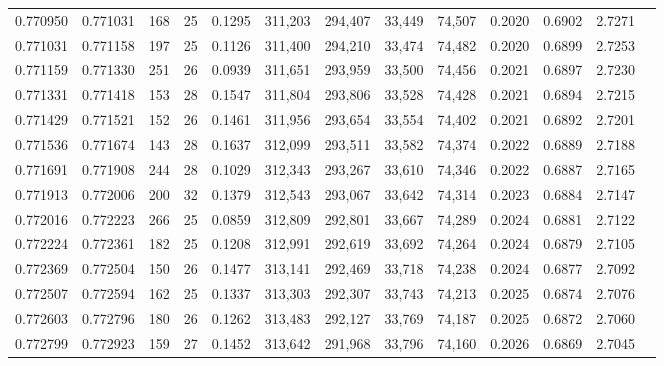 \begin{tabular}{rrrrrrrrrrrrr}
0.770950 & 0.771031 &   168 &  25 &                                     0.1295 & 311,203 & 294,407 &  33,449 &  74,507 & 0.2020 & 0.6902 & 2.7271 \\
0.771031 & 0.771158 &   197 &  25 &                                     0.1126 & 311,400 & 294,210 &  33,474 &  74,482 & 0.2020 & 0.6899 & 2.7253 \\
0.771159 & 0.771330 &   251 &  26 &                                     0.0939 & 311,651 & 293,959 &  33,500 &  74,456 & 0.2021 & 0.6897 & 2.7230 \\
0.771331 & 0.771418 &   153 &  28 &                                     0.1547 & 311,804 & 293,806 &  33,528 &  74,428 & 0.2021 & 0.6894 & 2.7215 \\
0.771429 & 0.771521 &   152 &  26 &                                     0.1461 & 311,956 & 293,654 &  33,554 &  74,402 & 0.2021 & 0.6892 & 2.7201 \\
0.771536 & 0.771674 &   143 &  28 &                                     0.1637 & 312,099 & 293,511 &  33,582 &  74,374 & 0.2022 & 0.6889 & 2.7188 \\
0.771691 & 0.771908 &   244 &  28 &                                     0.1029 & 312,343 & 293,267 &  33,610 &  74,346 & 0.2022 & 0.6887 & 2.7165 \\
0.771913 & 0.772006 &   200 &  32 &                                     0.1379 & 312,543 & 293,067 &  33,642 &  74,314 & 0.2023 & 0.6884 & 2.7147 \\
0.772016 & 0.772223 &   266 &  25 &                                     0.0859 & 312,809 & 292,801 &  33,667 &  74,289 & 0.2024 & 0.6881 & 2.7122 \\
0.772224 & 0.772361 &   182 &  25 &                                     0.1208 & 312,991 & 292,619 &  33,692 &  74,264 & 0.2024 & 0.6879 & 2.7105 \\
0.772369 & 0.772504 &   150 &  26 &                                     0.1477 & 313,141 & 292,469 &  33,718 &  74,238 & 0.2024 & 0.6877 & 2.7092 \\
0.772507 & 0.772594 &   162 &  25 &                                     0.1337 & 313,303 & 292,307 &  33,743 &  74,213 & 0.2025 & 0.6874 & 2.7076 \\
0.772603 & 0.772796 &   180 &  26 &                                     0.1262 & 313,483 & 292,127 &  33,769 &  74,187 & 0.2025 & 0.6872 & 2.7060 \\
0.772799 & 0.772923 &   159 &  27 &                                     0.1452 & 313,642 & 291,968 &  33,796 &  74,160 & 0.2026 & 0.6869 & 2.7045 \\

\end{tabular}
